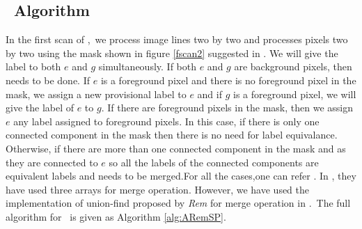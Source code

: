 \subsection{\aremsp\ Algorithm}


In the first scan of \aremsp,\ we process image lines two by two and processes
pixels two by two using the mask shown in figure \ref{fscan2} suggested in \cite{He2012_ARun}. 
We will give the label to both $e$ and $g$ simultaneously. If both $e$ and $g$ are background pixels,
then needs to be done. If $e$ is a foreground pixel and there is no foreground pixel in the mask, we assign a 
new provisional label to $e$ and if $g$ is a foreground pixel, we will give the
label of $e$ to $g$. If there are foreground pixels in the mask, then we assign $e$ any label assigned to 
foreground pixels. In this case, if there is only one connected component in the mask then there is 
no need for label equivalance. Otherwise, if there are more than one connected component in the mask and as 
they are connected to $e$ so all the labels of the connected components are
equivalent labels and needs to be merged.For all the cases,one can refer \cite{He2012_ARun}.
In \cite{He2012_ARun}, they have used three arrays for merge operation. However, we have used the implementation of 
union-find proposed by {\em Rem} \cite{Patwary2010_RemSP} for merge operation in
\aremsp.\ The full algorithm for \aremsp\ is given as Algorithm
\ref{alg:ARemSP}.


% 





 
